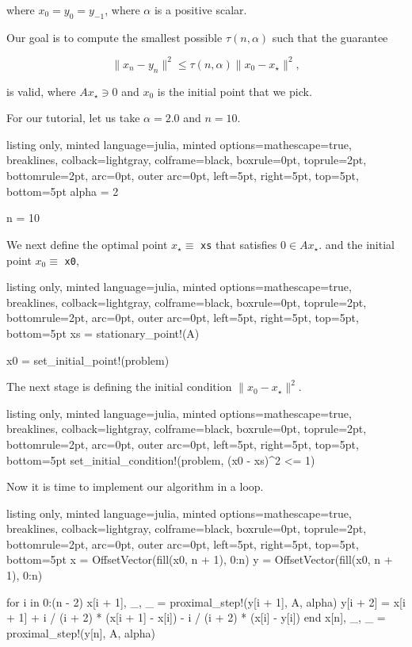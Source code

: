 \documentclass{article}
\begin{document}
where $x_0=y_0=y_{-1}$,  where $\alpha$ is a positive scalar. 

Our goal is to compute the smallest possible $\tau(n, \alpha)$ such that the guarantee

\begin{equation*}
\|x_n - y_n\|^2 \leqslant \tau(n, \alpha) \|x_0 - x_\star\|^2,
\end{equation*}

is valid, where $A x_\star \ni 0$ and $x_0$ is the initial point that we pick.

For our tutorial, let us take $\alpha = 2.0$ and $n=10$.

\begin{tcblisting}{listing only, minted language=julia, minted options={mathescape=true, breaklines}, colback=lightgray, colframe=black, boxrule=0pt, toprule=2pt, bottomrule=2pt, arc=0pt, outer arc=0pt, left=5pt, right=5pt, top=5pt, bottom=5pt}
alpha = 2

n = 10
\end{tcblisting}


We next define the optimal point $x_\star \equiv$ \texttt{xs} that  satisfies $0 \in Ax_\star$. and the initial point $x_0 \equiv $ \texttt{x0},

\begin{tcblisting}{listing only, minted language=julia, minted options={mathescape=true, breaklines}, colback=lightgray, colframe=black, boxrule=0pt, toprule=2pt, bottomrule=2pt, arc=0pt, outer arc=0pt, left=5pt, right=5pt, top=5pt, bottom=5pt}
xs = stationary_point!(A)

x0 = set_initial_point!(problem)
\end{tcblisting}


The next stage is defining the initial condition $\|x_0 - x_\star\|^2$.

\begin{tcblisting}{listing only, minted language=julia, minted options={mathescape=true, breaklines}, colback=lightgray, colframe=black, boxrule=0pt, toprule=2pt, bottomrule=2pt, arc=0pt, outer arc=0pt, left=5pt, right=5pt, top=5pt, bottom=5pt}
set_initial_condition!(problem, (x0 - xs)^2 <= 1)
\end{tcblisting}


Now it is time to implement our algorithm in a loop.

\begin{tcblisting}{listing only, minted language=julia, minted options={mathescape=true, breaklines}, colback=lightgray, colframe=black, boxrule=0pt, toprule=2pt, bottomrule=2pt, arc=0pt, outer arc=0pt, left=5pt, right=5pt, top=5pt, bottom=5pt}
x = OffsetVector(fill(x0, n + 1), 0:n)
y = OffsetVector(fill(x0, n + 1), 0:n)

for i in 0:(n - 2)
    x[i + 1], _, _ = proximal_step!(y[i + 1], A, alpha)
    y[i + 2] = x[i + 1] + i / (i + 2) * (x[i + 1] - x[i]) - i / (i + 2) * (x[i] - y[i])
end
x[n], _, _ = proximal_step!(y[n], A, alpha)
\end{tcblisting}
\end{document}
